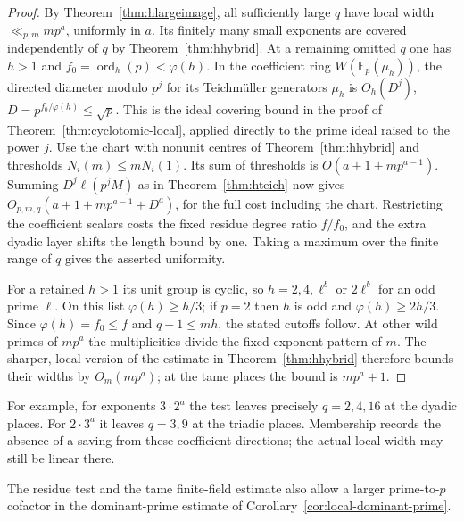 \documentclass[11pt,letterpaper]{article}
\theoremstyle{definition}
\numberwithin{equation}{section}
\begin{document}
\begin{proof}
By Theorem~\ref{thm:hlargeimage}, all sufficiently large $q$ have
local width $\ll_{p,m} mp^a$, uniformly in $a$. Its finitely many
small exponents are covered independently of $q$ by
Theorem~\ref{thm:hhybrid}. At a remaining omitted $q$ one has
$h>1$ and $f_0=\operatorname{ord}_h(p)<\varphi(h)$.
In the coefficient ring $W(\mathbb F_p(\mu_h))$, the directed
diameter modulo $p^j$ for its Teichm\"uller generators $\mu_h$ is
$O_h(D^j)$, $D=p^{f_0/\varphi(h)}\le\sqrt p$. This is the
ideal covering bound in the proof of Theorem~\ref{thm:cyclotomic-local},
applied directly to the prime ideal raised to the power $j$.
Use the chart with nonunit centres of Theorem~\ref{thm:hhybrid}
and thresholds $N_i(m)\le mN_i(1)$. Its sum of thresholds is
$O(a+1+mp^{a-1})$. Summing $D^j\ell(p^jM)$ as in
Theorem~\ref{thm:hteich} now gives
$O_{p,m,q}(a+1+mp^{a-1}+D^a)$, for the full cost including the
chart. Restricting the coefficient scalars costs the fixed residue
degree ratio $f/f_0$, and the extra dyadic layer shifts the length
bound by one. Taking a maximum over the finite range of $q$
gives the asserted uniformity.

For a retained $h>1$ its unit group is cyclic, so
$h=2,4,\ell^b$ or $2\ell^b$ for an odd prime $\ell$. On this
list $\varphi(h)\ge h/3$; if $p=2$ then $h$ is odd and
$\varphi(h)\ge 2h/3$. Since $\varphi(h)=f_0\le f$ and
$q-1\le mh$, the stated cutoffs follow. At other wild primes of
$mp^a$ the multiplicities divide the fixed exponent pattern of $m$.
The sharper, local version of the estimate in
Theorem~\ref{thm:hhybrid} therefore bounds their widths by
$O_m(mp^a)$; at the tame places the bound is $mp^a+1$.
\end{proof}
For example, for exponents $3\cdot2^a$ the test leaves precisely
$q=2,4,16$ at the dyadic places. For $2\cdot3^a$ it leaves
$q=3,9$ at the triadic places. Membership records the absence
of a saving from these coefficient directions; the actual local
width may still be linear there.

The residue test and the tame finite-field estimate also allow a
larger prime-to-$p$ cofactor in the dominant-prime estimate of
Corollary~\ref{cor:local-dominant-prime}.
\end{document}
